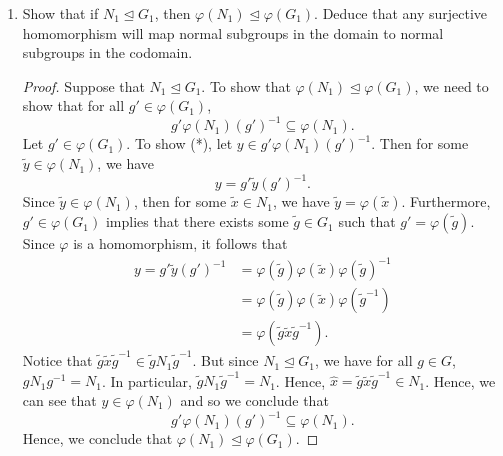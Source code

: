 \documentclass{article}
\begin{document}
\begin{problem}
\begin{enumerate}
\begin{proof}
\begin{align*}
                                    &= \{  g \in {G}_{1} : g \in \varphi^{-1}({N}_{2}) \} \\ 
                                    &= \varphi^{-1}({N}_{2}) \\
                                    &\trianglelefteq {G}_{1}.
            \end{align*}
            \end{proof}
        \item[(b)] Show that if \( {N}_{1} \trianglelefteq {G}_{1} \), then \( \varphi({N}_{1}) \trianglelefteq \varphi({G}_{1}) \). Deduce that any surjective homomorphism will map normal subgroups in the domain to normal subgroups in the codomain.
            \begin{proof}
            Suppose that \( {N}_{1} \trianglelefteq {G}_{1} \). To show that \( \varphi({N}_{1}) \trianglelefteq \varphi({G}_{1}) \), we need to show that for all \( g' \in \varphi({G}_{1}) \), 
            \[ g' \varphi({N}_{1}) (g')^{-1} \subseteq  \varphi({N}_{1}). \tag{*}  \]
            Let \( g' \in \varphi({G}_{1}) \). To show (*), let \( y \in g' \varphi({N}_{1}) (g')^{-1} \). Then for some \( \tilde{y} \in \varphi({N}_{1})\), we have 
            \[  y = g' \tilde{y} (g')^{-1}. \]
            Since \( \tilde{y} \in \varphi({N}_{1})  \), then for some \( \tilde{x} \in {N}_{1} \), we have \(  \tilde{y} = \varphi(\tilde{x}) \). Furthermore, \( g' \in \varphi({G}_{1}) \) implies that there exists some \( \tilde{g} \in  {G}_{1} \) such that \( g' = \varphi(\tilde{g}) \). Since \( \varphi  \) is a homomorphism, it follows that 
            \begin{align*}
                y = g' \tilde{y} (g')^{-1} &= \varphi(\tilde{g}) \varphi(\tilde{x}) \varphi(\tilde{g})^{-1} \\
                                           &= \varphi(\tilde{g}) \varphi(\tilde{x}) \varphi(\tilde{g}^{-1}) \\
                                           &= \varphi(\tilde{g} \tilde{x} \tilde{g}^{-1}).
            \end{align*}
            Notice that \( \tilde{g} \tilde{x} \tilde{g}^{-1} \in \tilde{g} {N}_{1} \tilde{g}^{-1}  \). But since \( {N}_{1} \trianglelefteq {G}_{1} \), we have for all \( g \in G  \), \( g {N}_{1} g^{-1} = {N}_{1} \). In particular, \( \tilde{g} {N}_{1} \tilde{g}^{-1} = {N}_{1} \). Hence,  
            \( \hat{x} = \tilde{g} \tilde{x} \tilde{g}^{-1} \in {N}_{1}  \). Hence, we can see that \( y \in \varphi({N}_{1}) \) and so we conclude that 
            \[ g' \varphi({N}_{1}) (g')^{-1} \subseteq  \varphi({N}_{1}).   \]
            Hence, we conclude that \( \varphi({N}_{1}) \trianglelefteq \varphi({G}_{1}) \). 


\end{proof}
\end{enumerate}
\end{problem}
\end{document}
